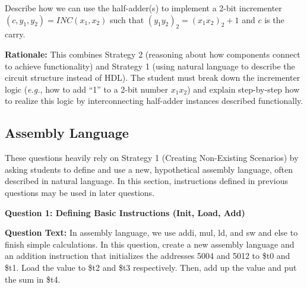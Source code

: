 \documentclass{article} %
\begin{document}
Describe how we can use the half-adder(s) to implement a 2-bit incrementer $(c, y_1, y_2) = INC(x_1, x_2)$ such that $(y_1y_2)_2 = (x_1x_2)_2 + 1$ and $c$ is the carry.

\textbf{Rationale:} This combines Strategy 2 (reasoning about how components connect to achieve functionality) and Strategy 1 (using natural language to describe the circuit structure instead of HDL). The student must break down the incrementer logic ({\em e.g.}, how to add ``1'' to a 2-bit number $x_1x_2$) and explain step-by-step how to realize this logic by interconnecting half-adder instances described functionally.

\subsection{Assembly Language}
These questions heavily rely on {Strategy 1 (Creating Non-Existing Scenarios)} by asking students to define and use a new, hypothetical assembly language, often described in natural language. In this section, instructions defined in previous questions may be used in later questions.

\textbf{Question 1: Defining Basic Instructions (Init, Load, Add)}

\textbf{Question Text:} In assembly language, we use addi, mul, ld, and sw and else to finish simple calculations. In this question, create a new assembly language and an addition instruction that initializes the addresses 5004 and 5012 to \$t0 and \$t1. Load the value to \$t2 and \$t3 respectively. Then, add up the value and put the sum in \$t4.
\end{document}
